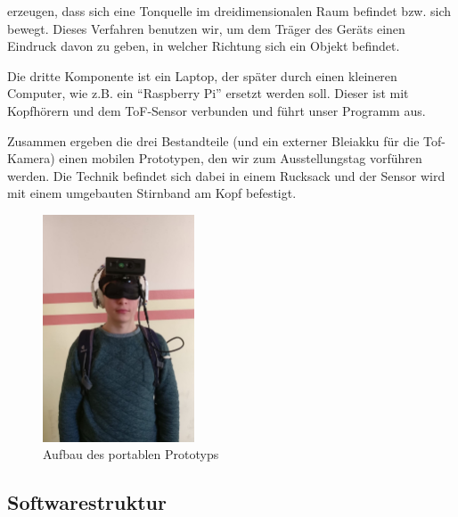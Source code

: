 \documentclass[a4paper,12pt,ngerman]{scrartcl}
\begin{document}
erzeugen, dass sich eine Tonquelle im dreidimensionalen
Raum befindet bzw. sich bewegt. Dieses Verfahren benutzen wir, um dem Träger des Geräts einen Eindruck
davon zu geben, in welcher Richtung sich ein Objekt befindet.\par 
Die dritte Komponente ist ein Laptop, der später durch einen kleineren Computer, wie z.B. ein \enquote{Raspberry Pi}
ersetzt werden soll. Dieser ist mit Kopfhörern und dem ToF-Sensor 
verbunden und führt unser Programm aus.\par 
Zusammen ergeben die drei Bestandteile (und ein externer Bleiakku für die Tof-Kamera) einen mobilen Prototypen, den wir zum Ausstellungstag vorführen werden. Die Technik befindet sich dabei in einem Rucksack und der Sensor wird mit einem
umgebauten Stirnband am Kopf befestigt. 
\begin{figure}[H]
	\centering
	\includegraphics[width=0.4\textwidth]{device}
	\caption{Aufbau des portablen Prototyps}
	\label{dosuas_device}
\end{figure} 

\subsection{Softwarestruktur}
\end{document}
